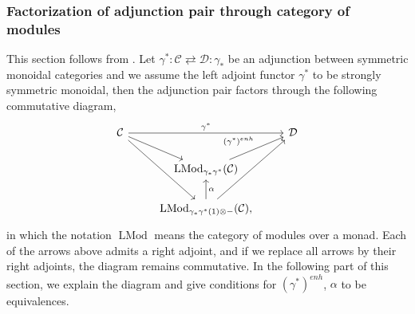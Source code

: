 \documentclass{article}
\theoremstyle{definition}
\newcommand{\on}{\operatorname}
\begin{document}
\subsubsection{Factorization of adjunction pair through category of modules}\label{fac}
This section follows from \cite{EK}. Let $\gamma^\ast: \mathcal{C} \rightleftarrows \mathcal{D}: \gamma_\ast$ be an adjunction between symmetric monoidal categories and we assume the left adjoint functor $\gamma^\ast$ to be strongly symmetric monoidal, then the adjunction pair factors through the following commutative diagram,
\[\begin{tikzcd}
	{\mathcal{C}} && {\mathcal{D}} \\
	& {\on{LMod}_{\gamma_\ast\gamma^\ast}(\mathcal{C})} \\
	& {\on{LMod}_{\gamma_\ast\gamma^\ast(1)\otimes-}(\mathcal{C})}
	\arrow["{\gamma^\ast}", from=1-1, to=1-3]
	\arrow[from=1-1, to=2-2]
	\arrow[from=1-1, to=3-2]
	\arrow["{{(\gamma^\ast)^{enh}}}", from=2-2, to=1-3]
	\arrow[from=3-2, to=1-3]
	\arrow["\alpha"', from=3-2, to=2-2],
\end{tikzcd}\]
in which the notation $\on{LMod}$ means the category of modules over a monad. Each of the arrows above admits a right adjoint, and if we replace all arrows by their right adjoints, the diagram remains commutative. In the following part of this section, we explain the diagram and give conditions for $(\gamma^\ast)^{enh}$, $\alpha$ to be equivalences.
\end{document}

